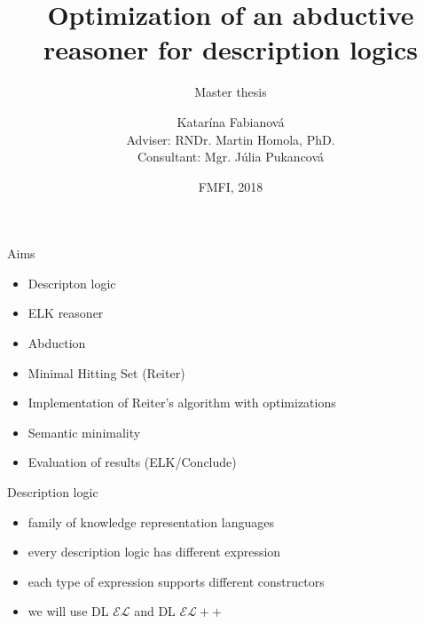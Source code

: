 \documentclass{beamer}
\title{Optimization of an abductive reasoner for description logics}
\subtitle{Master thesis}
\author{Katarína Fabianová \\ Adviser: RNDr. Martin Homola, PhD. \\ Consultant:  Mgr. Júlia Pukancová}
\date{FMFI, 2018}
\begin{document}
\begin{frame}
  \titlepage
\end{frame}



\begin{frame}{Aims}
	\begin{itemize}
		
		\item {
			Descripton logic
		}
		
		\item {
			ELK reasoner
		}
		
		\item {
			Abduction
		}
				
		\item {
			Minimal Hitting Set (Reiter)
		}
										
		\item {
			Implementation of Reiter's algorithm with optimizations
		}
		
		\item {
			Semantic minimality
		}
				
		\item {
			Evaluation of results (ELK/Conclude)
		}
										
	\end{itemize}
\end{frame}


\begin{frame}{Description logic}
  \begin{itemize}
	
	\item {
		family of knowledge representation languages
	}
	
	\item {
		every description logic has different expression
	}
	
	\item {
		each type of expression supports different constructors
	}
	
	\item {
		we will use DL $\mathcal{EL}$ and DL $\mathcal{EL{+}{+}}$
	}

  \end{itemize}
\end{frame}
\end{document}
